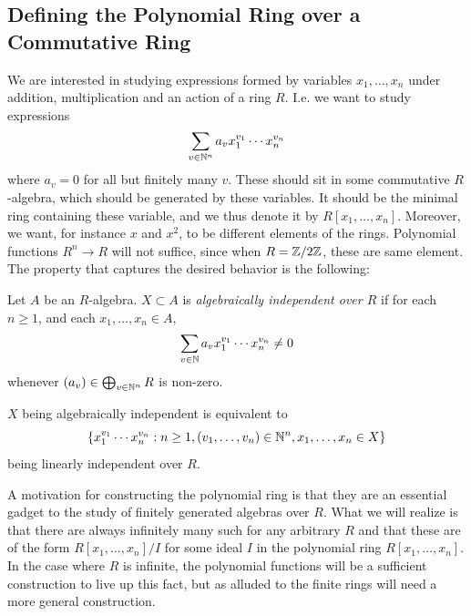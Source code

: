 \subsection{Defining the Polynomial Ring over a Commutative Ring}
We are interested in studying expressions formed by variables $x_1,\dots, x_n$ under addition, multiplication and an action of a ring $R$. I.e. we want to study expressions
$$
    \sum_{v\in \mathbb{N}^n} a_vx_1^{v_1}\cdots x_n^{v_n}
$$
where $a_v = 0$ for all but finitely many $v$. These should sit in some commutative $R$-algebra, which should be generated by these variables. It should be the minimal ring containing these variable, and we thus denote it by $R[x_1,\dots,x_n]$. Moreover, we want, for instance $x$ and $x^2$, to be different elements of the rings. Polynomial functions $R^n \rightarrow R$ will not suffice, since when $R=\mathbb{Z}/2\mathbb{Z}$, these are same element. The property that captures the desired behavior is the following: 
\begin{definition}
    Let $A$ be an $R$-algebra. $X\subset A$ is \emph{algebraically independent over $R$} if for each $n\geq 1$, and each $x_1,\dots,x_n\in A$,
    $$
        \sum_{v\in \mathbb{N}} a_v x_1^{v_1}\cdots x_n^{v_n} \neq 0 
    $$ 
    whenever $(a_v)\in \bigoplus_{v\in \mathbb{N}^n} R$ is non-zero. 
\end{definition}
\begin{remark}
    $X$ being algebraically independent is equivalent to 
    $$
        \left\{ x_1^{v_1}\cdots x_n^{v_n} : n\geq 1, (v_1,\dots,v_n)\in \mathbb{N}^n, x_1,\dots,x_n\in X \right\}
    $$
    being linearly independent over $R.$
\end{remark}
A motivation for constructing the polynomial ring is that they are an essential gadget to the study of finitely generated algebras over $R$. What we will realize is that there are always infinitely many such for any arbitrary $R$ and that these are of the form $R[x_1,\dots,x_n]/I$ for some ideal $I$ in the polynomial ring $R[x_1,\dots,x_n]$. In the case where $R$ is infinite, the polynomial functions will be a sufficient construction to live up this fact, but as alluded to the finite rings will need a more general construction.

